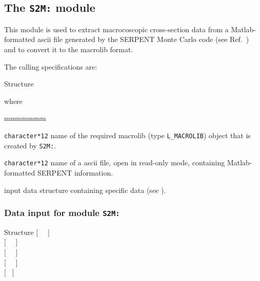\subsection{The {\tt S2M:} module}\label{sect:S2MData}

This module is used to extract macrocoscopic cross-section data from a Matlab-formatted {\sc ascii} file generated by the SERPENT Monte Carlo code (see Ref.~) and to convert it to the {\sc macrolib} format.

\vskip 0.02cm

The calling specifications are:

\begin{DataStructure}{Structure }
~\moc{:=}~~~\moc{::}~ \\
\end{DataStructure}

\noindent where
\begin{ListeDeDescription}{mmmmmmm}

\item[\dusa{MACRO}] {\tt character*12} name of the required {\sc macrolib} (type {\tt L\_MACROLIB}) object that is created by {\tt S2M:}.

\item[\dusa{matlab.m}] {\tt character*12} name of a {\sc ascii} file, open in read-only mode, containing Matlab-formatted SERPENT information.

\item[\dusa{S2M\_data}] input data structure containing specific data (see ).

\end{ListeDeDescription}

\subsubsection{Data input for module {\tt S2M:}}\label{sect:descS2M}

\vskip -0.5cm

\begin{DataStructure}{Structure }
$[$~ ~$]$ \\
$[$~ ~$]$ \\
$[$~ ~$]$ \\
$[$~ ~$]$ \\
$[$~ $]$ \\
\moc{;}
\end{DataStructure}

